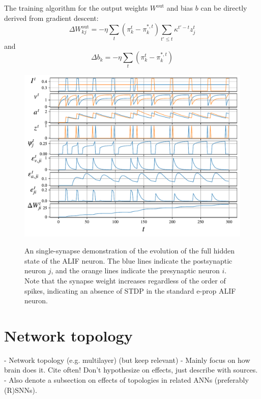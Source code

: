        The training algorithm for the output weights $W^\text{out}$ and bias $b$ can be directly derived from gradient descent:
        \begin{equation}
        \Delta W^\text{out}_{kj} = -\eta \sum_t\left(\pi^t_k - \pi^{*,t}_k\right)\sum_{t'\leq t}\kappa^{t'-t}z^t_j
        \end{equation}
        and
        \begin{equation}
        \Delta b_k = -\eta \sum_t\left(\pi^t_k - \pi^{*,t}_k\right)
        \end{equation}

        \begin{figure}[!ht]
            \centering
            \includegraphics[width=\linewidth]{gfx/alif}
            \label{fig:alif}
            \caption{An single-synapse demonstration of the evolution of the full hidden state of the ALIF neuron. The blue lines indicate the postsynaptic neuron $j$, and the orange lines indicate the presynaptic neuron $i$. Note that the synapse weight increases regardless of the order of spikes, indicating an absence of STDP in the standard e-prop ALIF neuron.}
        \end{figure}


\section{Network topology}

    \begin{tcolorbox}[colback=orange]
      - Network topology (e.g. multilayer) (but keep relevant)
      - Mainly focus on how brain does it. Cite often! Don't hypothesize on effects, just describe with sources.
      - Also denote a subsection on effects of topologies in related ANNs (preferably (R)SNNs).

    \end{tcolorbox}
